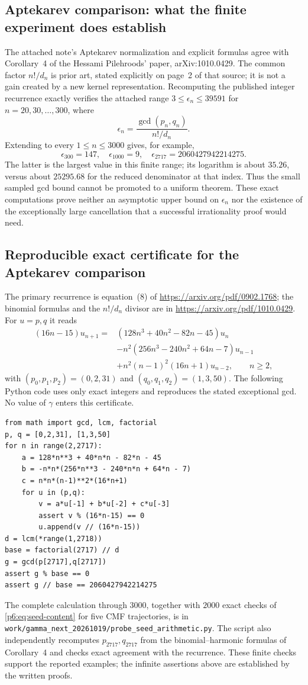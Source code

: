 \documentclass[11pt,a4paper]{article}
\theoremstyle{definition}
\theoremstyle{remark}
\numberwithin{equation}{section}
\begin{document}
\subsection{Aptekarev comparison: what the finite experiment does establish}
The attached note's Aptekarev normalization and explicit formulas agree
with Corollary~4 of the Hessami Pilehroods' paper, arXiv:1010.0429.
The common factor $n!/d_n$ is prior art, stated explicitly on page~2
of that source; it is not a gain created by a new kernel representation.
Recomputing the published integer recurrence exactly verifies the attached
range $3\le\epsilon_n\le39591$ for $n=20,30,\ldots,300$, where
\[
 \epsilon_n=\frac{\gcd(p_n,q_n)}{n!/d_n}.
\]
Extending to every $1\le n\le3000$ gives, for example,
\[
 \epsilon_{300}=147,\quad \epsilon_{1000}=9,\quad
 \epsilon_{2717}=2060427942214275.
\]
The latter is the largest value in this finite range; its logarithm is
about $35.26$, versus about $25295.68$ for the reduced denominator at
that index. Thus the small sampled gcd bound cannot be promoted to a
uniform theorem. These exact computations prove neither an asymptotic
upper bound on $\epsilon_n$ nor the existence of the exceptionally large
cancellation that a successful irrationality proof would need.


\subsection{Reproducible exact certificate for the Aptekarev comparison}
The primary recurrence is equation~(8) of
\url{https://arxiv.org/pdf/0902.1768}; the binomial formulas and the
$n!/d_n$ divisor are in
\url{https://arxiv.org/pdf/1010.0429}.
For $u=p,q$ it reads
\begin{align*}
 (16n-15)u_{n+1}={}&(128n^3+40n^2-82n-45)u_n\\
 &-n^2(256n^3-240n^2+64n-7)u_{n-1}\\
 &+n^2(n-1)^2(16n+1)u_{n-2},\qquad n\ge2,
\end{align*}
with $(p_0,p_1,p_2)=(0,2,31)$ and $(q_0,q_1,q_2)=(1,3,50)$.
The following Python code uses only exact integers and reproduces the
stated exceptional gcd. No value of $\gamma$ enters this certificate.
\begin{lstlisting}
from math import gcd, lcm, factorial
p, q = [0,2,31], [1,3,50]
for n in range(2,2717):
    a = 128*n**3 + 40*n*n - 82*n - 45
    b = -n*n*(256*n**3 - 240*n*n + 64*n - 7)
    c = n*n*(n-1)**2*(16*n+1)
    for u in (p,q):
        v = a*u[-1] + b*u[-2] + c*u[-3]
        assert v % (16*n-15) == 0
        u.append(v // (16*n-15))
d = lcm(*range(1,2718))
base = factorial(2717) // d
g = gcd(p[2717],q[2717])
assert g % base == 0
assert g // base == 2060427942214275
\end{lstlisting}
The complete calculation through $3000$, together with $2000$ exact
checks of \eqref{p6:eq:seed-content} for five CMF trajectories, is in
\texttt{work/gamma\_next\_20261019/probe\_seed\_arithmetic.py}.
The script also independently recomputes $p_{2717},q_{2717}$ from the
binomial--harmonic formulas of Corollary~4 and checks exact agreement
with the recurrence. These finite checks support the reported examples;
the infinite assertions above are established by the written proofs.
\end{document}
